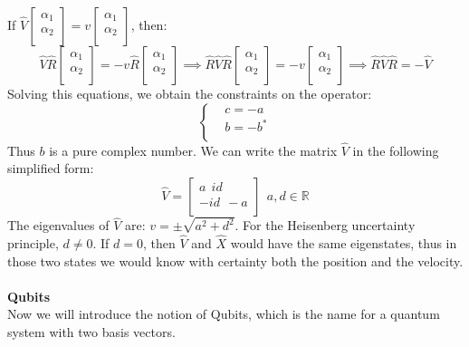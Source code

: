 \documentclass{article}
\begin{document}
If $\hat{V} \begin{bmatrix}
    \alpha_1 \\
    \alpha_2 \\
\end{bmatrix} = v \begin{bmatrix}
    \alpha_1 \\
    \alpha_2 \\
\end{bmatrix}$, then:
$$\hat{V} \hat{R} \begin{bmatrix}
    \alpha_1 \\
    \alpha_2 \\
\end{bmatrix} = -v \hat{R}\begin{bmatrix}
    \alpha_1 \\
    \alpha_2 \\
\end{bmatrix} \implies \hat{R}\hat{V}\hat{R}\begin{bmatrix}
    \alpha_1 \\
    \alpha_2 \\
\end{bmatrix} = -v \begin{bmatrix}
    \alpha_1 \\
    \alpha_2 \\
\end{bmatrix} \implies \hat{R}\hat{V}\hat{R} = - \hat{V}$$
Solving this equations, we obtain the constraints on the operator:
$$\begin{cases}
     &  c=-a \\
     & b =-b^*\\ 
\end{cases} $$
Thus $b$ is a pure complex number. We can write the matrix $\hat{V}$ in the following simplified form: \ \ 
$$\hat{V} = \begin{bmatrix}
    a \ \ id  \\
    -id \ \ -a \\
\end{bmatrix}  \ \ a,d \in \mathbb{R}$$
The eigenvalues of $\hat{V}$ are: $v= \pm \sqrt{a^2+d^2}$.
For the Heisenberg uncertainty principle, $d \neq 0$. If $d = 0$, then $\hat{V}$ and $\hat{X}$ would have the same eigenstates, thus in those two states we would know with certainty both the position and the velocity.\\  \\
\textbf{Qubits} \\
Now we will introduce the notion of Qubits, which is the name for a quantum system with two basis vectors. \\ 
\end{document}
